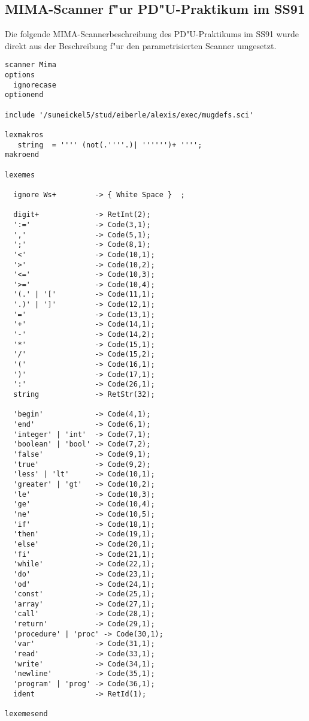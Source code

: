\subsection{MIMA-Scanner f"ur PD"U-Praktikum im SS91}
Die folgende MIMA-Scannerbeschreibung des PD"U-Praktikums im SS91 wurde direkt 
aus der Beschreibung f"ur den parametrisierten Scanner umgesetzt.
 
\begin{verbatim}
scanner Mima
options
  ignorecase
optionend

include '/suneickel5/stud/eiberle/alexis/exec/mugdefs.sci'
 
lexmakros
   string  = '''' (not(.''''.)| '''''')+ '''';
makroend

lexemes

  ignore Ws+         -> { White Space }  ;
  
  digit+             -> RetInt(2); 
  ':='               -> Code(3,1);
  ','                -> Code(5,1); 
  ';'                -> Code(8,1);
  '<'                -> Code(10,1);
  '>'                -> Code(10,2);
  '<='               -> Code(10,3);
  '>='               -> Code(10,4);
  '(.' | '['         -> Code(11,1);
  '.)' | ']'         -> Code(12,1);
  '='                -> Code(13,1);
  '+'                -> Code(14,1);
  '-'                -> Code(14,2);
  '*'                -> Code(15,1);
  '/'                -> Code(15,2);
  '('                -> Code(16,1);
  ')'                -> Code(17,1);
  ':'                -> Code(26,1);
  string             -> RetStr(32);

  'begin'            -> Code(4,1);
  'end'              -> Code(6,1);
  'integer' | 'int'  -> Code(7,1);
  'boolean' | 'bool' -> Code(7,2);
  'false'            -> Code(9,1);
  'true'             -> Code(9,2);
  'less' | 'lt'      -> Code(10,1);
  'greater' | 'gt'   -> Code(10,2);
  'le'               -> Code(10,3);
  'ge'               -> Code(10,4);
  'ne'               -> Code(10,5);
  'if'               -> Code(18,1);
  'then'             -> Code(19,1);
  'else'             -> Code(20,1);
  'fi'               -> Code(21,1);
  'while'            -> Code(22,1);
  'do'               -> Code(23,1);
  'od'               -> Code(24,1);
  'const'            -> Code(25,1);
  'array'            -> Code(27,1);
  'call'             -> Code(28,1);
  'return'           -> Code(29,1);
  'procedure' | 'proc' -> Code(30,1);
  'var'              -> Code(31,1);
  'read'             -> Code(33,1);
  'write'            -> Code(34,1);
  'newline'          -> Code(35,1);
  'program' | 'prog' -> Code(36,1);
  ident              -> RetId(1);

lexemesend
\end{verbatim}
\vfill \eject
